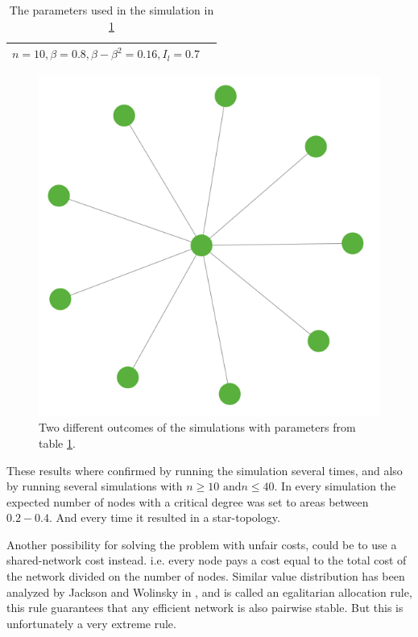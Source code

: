 \begin{table}[h]
\centering
\begin{tabular}{lc}
 \hline
  $
  n=10,
  \beta=0.8,
  \beta-\beta^2=0.16,
  I_{l}=0.7$\\
  \hline
\end{tabular}
\caption{The parameters used in the simulation in \ref{fig:startennodes} \label{tbl:discountstar}}
\end{table}

\begin{figure}[h]
\centering

  \includegraphics[width=0.9\linewidth]{../Figures/discount/startennodes.png}

\caption{\label{fig:startennodes} Two different outcomes of the simulations with parameters from table \ref{tbl:discountstar}.}
\end{figure}
These results where confirmed by running the simulation several times, and also by running several simulations with $n \geq 10 \text{ and} n\leq 40$. In every simulation the expected number of nodes with a critical degree was set to areas between $0.2 - 0.4$. And every time it resulted in a star-topology.

Another possibility for solving the problem with unfair costs, could be to use a shared-network cost instead. i.e. every node pays a cost equal to the total cost of the network divided on the number of nodes. 
Similar value distribution has been analyzed by Jackson and Wolinsky in \cite{jackson1996strategic}, and is called an egalitarian allocation rule, this rule guarantees that any efficient network is also pairwise stable. But this is unfortunately a very extreme rule.






